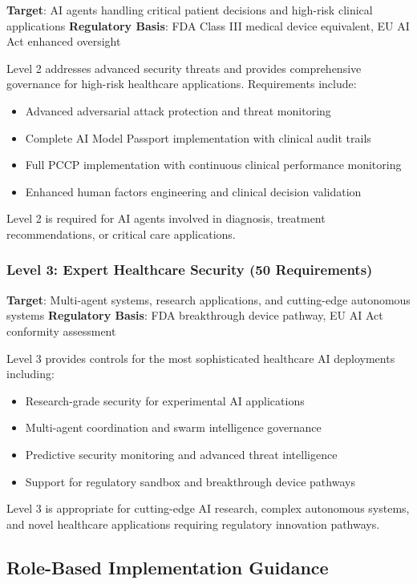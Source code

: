 \documentclass[11pt]{article}
\begin{document}
\textbf{Target}: AI agents handling critical patient decisions and high-risk clinical applications
\textbf{Regulatory Basis}: FDA Class III medical device equivalent, EU AI Act enhanced oversight

Level 2 addresses advanced security threats and provides comprehensive governance for high-risk healthcare applications. Requirements include:
\begin{itemize}
    \item Advanced adversarial attack protection and threat monitoring
    \item Complete AI Model Passport implementation with clinical audit trails
    \item Full PCCP implementation with continuous clinical performance monitoring
    \item Enhanced human factors engineering and clinical decision validation
\end{itemize}

Level 2 is required for AI agents involved in diagnosis, treatment recommendations, or critical care applications.

\subsubsection{Level 3: Expert Healthcare Security (50 Requirements)}

\textbf{Target}: Multi-agent systems, research applications, and cutting-edge autonomous systems
\textbf{Regulatory Basis}: FDA breakthrough device pathway, EU AI Act conformity assessment

Level 3 provides controls for the most sophisticated healthcare AI deployments including:
\begin{itemize}
    \item Research-grade security for experimental AI applications
    \item Multi-agent coordination and swarm intelligence governance
    \item Predictive security monitoring and advanced threat intelligence
    \item Support for regulatory sandbox and breakthrough device pathways
\end{itemize}

Level 3 is appropriate for cutting-edge AI research, complex autonomous systems, and novel healthcare applications requiring regulatory innovation pathways.

\subsection{Role-Based Implementation Guidance}
\end{document}
